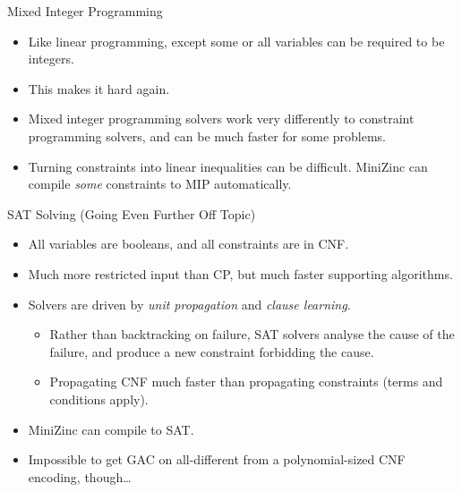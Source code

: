 \documentclass{beamer}
\begin{document}
\begin{frame}{Mixed Integer Programming}
    \begin{itemize}
        \item Like linear programming, except some or all variables can be required to be integers.
        \item This makes it hard again.
        \item Mixed integer programming solvers work very differently to constraint programming
            solvers, and can be much faster for some problems.
        \item Turning constraints into linear inequalities can be difficult. MiniZinc can compile
            \emph{some} constraints to MIP automatically.
    \end{itemize}
\end{frame}

\begin{frame}{SAT Solving (Going Even Further Off Topic)}
    \begin{itemize}
        \item All variables are booleans, and all constraints are in CNF.
        \item Much more restricted input than CP, but much faster supporting algorithms.
        \item Solvers are driven by \emph{unit propagation} and \emph{clause learning}.
            \begin{itemize}
                \item Rather than backtracking on failure, SAT solvers analyse the cause of the
                    failure, and produce a new constraint forbidding the cause.
                \item Propagating CNF much faster than propagating constraints
                    (terms and conditions apply).
            \end{itemize}
        \item MiniZinc can compile to SAT.
        \item Impossible to get GAC on all-different from a polynomial-sized
            CNF encoding, though\ldots
    \end{itemize}
\end{frame}
\end{document}
